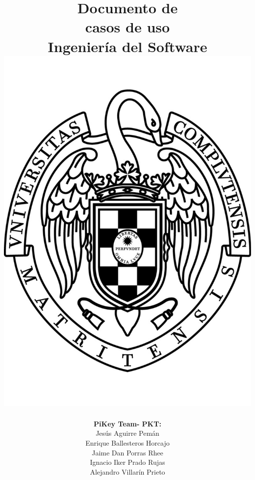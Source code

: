 \documentclass[spanish,a4paper,11pt, twoside]{report}	%
\begin{document}
\title{\textbf{\huge{Documento de \\ 
	casos de uso}} \\ \vspace{0.3cm}
	\Large{Ingeniería del Software} \\
	\includegraphics[scale=0.3]{ucm.pdf}}
\author{ \textbf{\Large{PiKey Team- PKT:}} \vspace{0.2cm} \\
	Jesús Aguirre Pemán \\
	 Enrique Ballesteros Horcajo \\
	 Jaime Dan Porras Rhee \\
	 Ignacio Iker Prado Rujas \\
	 Alejandro Villarín Prieto }
\date{\Today}
\maketitle
\end{document}
